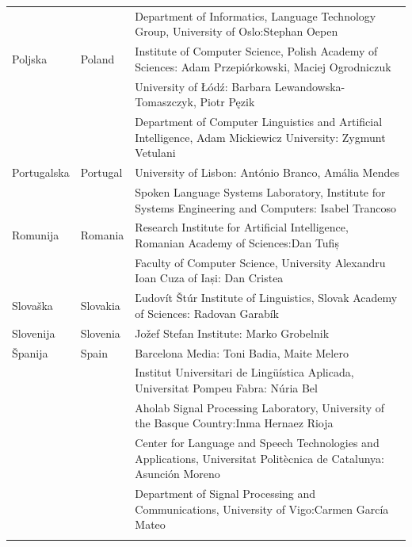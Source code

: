 \begin{longtable}{@{}llp{113mm}@{}}
  & & Department of Informatics, Language Technology Group, University of Oslo:\newline Stephan Oepen \\ \addlinespace
  Poljska & \textcolor{grey1}{Poland} & Institute of Computer Science, Polish Academy of Sciences: Adam Przepiórkowski, Maciej Ogrodniczuk \\ \addlinespace
  & & University of Łódź: Barbara Lewandowska-Tomaszczyk, Piotr Pęzik\\ \addlinespace
  & & Department of Computer Linguistics and Artificial Intelligence, Adam Mickiewicz University: Zygmunt Vetulani \\ \addlinespace
  Portugalska & \textcolor{grey1}{Portugal} & University of Lisbon: António Branco, Amália Mendes\\ \addlinespace %
  & & Spoken Language Systems Laboratory, Institute for Systems Engineering and Computers: Isabel Trancoso \\ \addlinespace
  Romunija & \textcolor{grey1}{Romania} & Research Institute for Artificial Intelligence, Romanian Academy of Sciences:\newline Dan Tufiș \\ \addlinespace
  & & Faculty of Computer Science, University Alexandru Ioan Cuza of Iași: Dan Cristea \\ \addlinespace
  Slovaška & \textcolor{grey1}{Slovakia} & Ľudovít Štúr Institute of Linguistics, Slovak Academy of Sciences: Radovan Garabík  \\ \addlinespace 
  Slovenija & \textcolor{grey1}{Slovenia} & Jožef Stefan Institute: Marko Grobelnik \\ \addlinespace 
  Španija & \textcolor{grey1}{Spain} & Barcelona Media: Toni Badia, Maite Melero \\ \addlinespace 
  & & Institut Universitari de Lingüística Aplicada, Universitat Pompeu Fabra: Núria Bel \\ \addlinespace 
  & & Aholab Signal Processing Laboratory, University of the Basque Country:\newline Inma Hernaez Rioja \\ \addlinespace 
  & & Center for Language and Speech Technologies and Applications, Universitat Politècnica de Catalunya:  Asunción Moreno \\ \addlinespace 
  & & Department of Signal Processing and Communications, University of Vigo:\newline Carmen García Mateo \\ \addlinespace 

\end{longtable}
